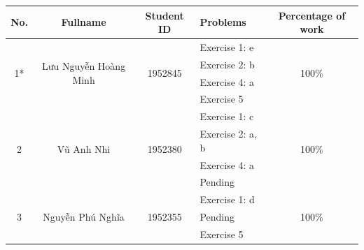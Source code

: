 \documentclass[a4paper]{article}
\begin{document}
\begin{center}
  \begin{tabular}{|c|c|c|l|c|}
    \hline
    \textbf{No.}        & \textbf{Fullname}                      & \textbf{Student ID}      & \textbf{Problems}              & \textbf{Percentage of work} \\
    \hline
    \multirow{4}{*}{1*} & \multirow{4}{*}{Lưu Nguyễn Hoàng Minh} & \multirow{4}{*}{1952845} & \textendash{} Exercise 1: e    & \multirow{4}{*}{100\%}      \\
                        &                                        &                          & \textendash{} Exercise 2: b    &                             \\
                        &                                        &                          & \textendash{} Exercise 4: a    &                             \\
                        &                                        &                          & \textendash{} Exercise 5       &                             \\
    \hline
    \multirow{4}{*}{2}  & \multirow{4}{*}{Vũ Anh Nhi}            & \multirow{4}{*}{1952380} & \textendash{} Exercise 1: c    & \multirow{4}{*}{100\%}      \\
                        &                                        &                          & \textendash{} Exercise 2: a, b &                             \\
                        &                                        &                          & \textendash{} Exercise 4: a    &                             \\
                        &                                        &                          & \textendash{} Pending          &                             \\
    \hline
    \multirow{4}{*}{3}  & \multirow{4}{*}{Nguyễn Phú Nghĩa}      & \multirow{4}{*}{1952355} & \textendash{} Exercise 1: d    & \multirow{4}{*}{100\%}      \\
                        &                                        &                          & \textendash{} Pending          &                             \\
                        &                                        &                          & \textendash{} Exercise 5       &                             \\

\end{tabular}
\end{center}
\end{document}
